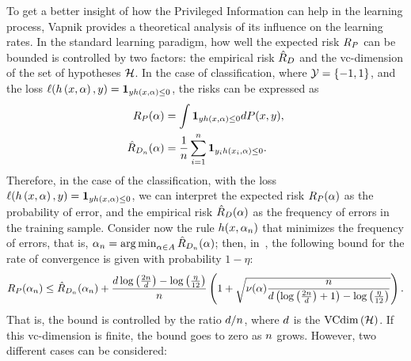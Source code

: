 To get a better insight of how the Privileged Information can help in the learning process, Vapnik provides a theoretical analysis of its influence on the learning rates.
In the standard learning paradigm, how well the expected risk $R_P$ can be bounded is controlled by two factors: the empirical risk $\hat{R}_{D}$ and the \acrshort{vc}-dimension of the set of hypotheses $\mathcal{\mathcal{H}}$.
In the case of classification, where $\mathcal{Y} = \left\{-1, 1\right\}$, and the loss $\ell(h\left(x, \alpha\right), y) = \bm{1}_{y h\left(x, \alpha\right) \leq 0}$, the risks can be expressed as
\begin{align*}
    \nonumber
    R_P (\alpha) &= \int \bm{1}_{y h\left(x, \alpha\right) \leq 0} dP(x, y),\\
    \hat{R}_{D_{n}}(\alpha) &= \frac{1}{n} \sum_{i=1}^n \bm{1}_{y_i h\left(x_i, \alpha\right) \leq 0}.
\end{align*}
Therefore, in the case of the classification, with the loss $\ell(h\left(x, \alpha\right), y) = \bm{1}_{y h\left(x, \alpha\right) \leq 0}$, we can interpret the expected risk $R_P (\alpha)$ as the probability of error, and the empirical risk $\hat{R}_{D}(\alpha)$ as the frequency of errors in the training sample.
Consider now the rule $h(x, \alpha_n)$ that minimizes the frequency of errors, that is, $\alpha_n = \operatorname*{arg\min}_{\alpha \in A} \hat{R}_{D_{n}}(\alpha)$; then, in~\citet[Theorem~6.8]{vapnik1982estimation}, the following bound for the rate of convergence is given with probability $1 - \eta$:
\begin{equation}
    \nonumber
    R_P(\alpha_n) \leq \hat{R}_{D_{n}}(\alpha_n) + \frac{d \log\left(\frac{2n}{d} \right) - \log\left(\frac{\eta}{12}\right)}{n} \left(1 + \sqrt{\nu(\alpha) \frac{n}{d \left(\log\left(\frac{2n}{d} \right) + 1\right) - \log\left(\frac{\eta}{12}\right)}} \right) .
\end{equation}
That is, the bound is controlled by the ratio $d/n$, where $d$ is the $\operatorname{VCdim}\left(\mathcal{H}\right)$. If this \acrshort{vc}-dimension is finite, the bound goes to zero as $n$ grows.
However, two different cases can be considered:
